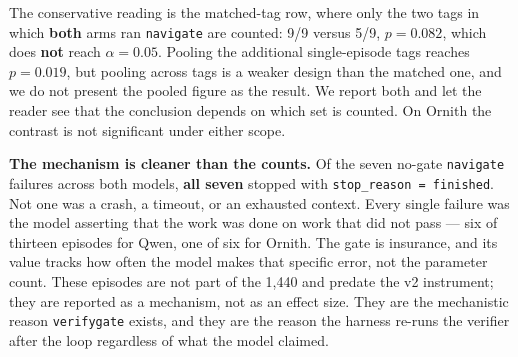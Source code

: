 \documentclass[
  10pt,
  a4paper,
]{article}
\let\oldtexttt\texttt
\renewcommand{\texttt}[1]{{\small\oldtexttt{#1}}}
\begin{document}
The conservative reading is the matched-tag row, where only the two tags
in which \textbf{both} arms ran \texttt{navigate} are counted: 9/9
versus 5/9, \(p = 0.082\), which does \textbf{not} reach
\(\alpha = 0.05\). Pooling the additional single-episode tags reaches
\(p = 0.019\), but pooling across tags is a weaker design than the
matched one, and we do not present the pooled figure as the result. We
report both and let the reader see that the conclusion depends on which
set is counted. On Ornith the contrast is not significant under either
scope.

\textbf{The mechanism is cleaner than the counts.} Of the seven no-gate
\texttt{navigate} failures across both models, \textbf{all seven}
stopped with \texttt{stop\_reason\ =\ finished}. Not one was a crash, a
timeout, or an exhausted context. Every single failure was the model
asserting that the work was done on work that did not pass --- six of
thirteen episodes for Qwen, one of six for Ornith. The gate is
insurance, and its value tracks how often the model makes that specific
error, not the parameter count. These episodes are not part of the 1,440
and predate the v2 instrument; they are reported as a mechanism, not as
an effect size. They are the mechanistic reason \texttt{verifygate}
exists, and they are the reason the harness re-runs the verifier after
the loop regardless of what the model claimed.
\end{document}
